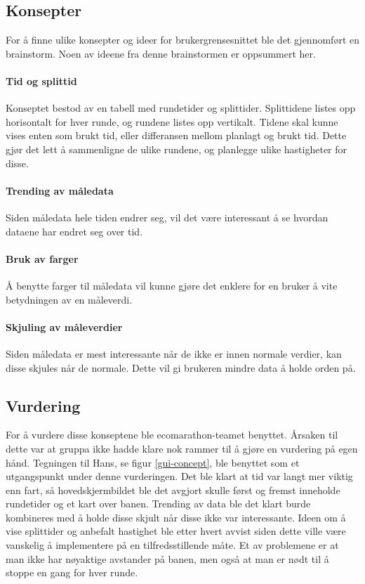 \subsection{Konsepter}
For å finne ulike konsepter og ideer for brukergrensesnittet ble det gjennomført en brainstorm.
Noen av ideene fra denne brainstormen er oppsummert her.

\paragraph{Tid og splittid}
Konseptet bestod av en tabell med rundetider og splittider.
Splittidene listes opp horisontalt for hver runde, og rundene listes opp vertikalt.
Tidene skal kunne vises enten som brukt tid, eller differansen mellom planlagt og brukt tid.
Dette gjør det lett å sammenligne de ulike rundene, og planlegge ulike hastigheter for disse.

\paragraph{Trending av måledata}
Siden måledata hele tiden endrer seg, vil det være interessant å se hvordan dataene har endret seg over tid.

\paragraph{Bruk av farger}
Å benytte farger til måledata vil kunne gjøre det enklere for en bruker å vite betydningen av en måleverdi.

\paragraph{Skjuling av måleverdier}
Siden måledata er mest interessante når de ikke er innen normale verdier, kan disse skjules når de normale.
Dette vil gi brukeren mindre data å holde orden på.

\subsection{Vurdering}
For å vurdere disse konseptene ble ecomarathon-teamet benyttet.
Årsaken til dette var at gruppa ikke hadde klare nok rammer til å gjøre en vurdering på egen hånd.
Tegningen til Hans, se figur \ref{gui-concept}, ble benyttet som et utgangspunkt under denne vurderingen.
Det ble klart at tid var langt mer viktig enn fart, så hovedskjermbildet ble det avgjort skulle først og fremst inneholde rundetider og et kart over banen. 
Trending av data ble det klart burde kombineres med å holde disse skjult når disse ikke var interessante.
Ideen om å vise splittider og anbefalt hastighet ble etter hvert avvist siden dette ville være vanskelig å implementere på en tilfredsstillende måte.
Et av problemene er at man ikke har nøyaktige avstander på banen, men også at man er nødt til å stoppe en gang for hver runde.

